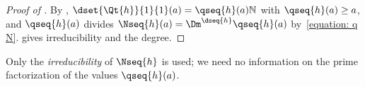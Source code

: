 \begin{proof}[Proof of ]
    By , $\dset{\Qt{h}}{1}{1}(a) = \qseq{h}(a) \nat$ with $\qseq{h}(a) \ge a$, and $\qseq{h}(a)$ divides $\Nseq{h}(a) = \Dm^{\dseq{h}} \qseq{h}(a)$ by~\eqref{equation: q N}.
     gives irreducibility and the degree.
\end{proof}
Only the \emph{irreducibility} of $\Nseq{h}$ is used; we need no information on the prime factorization of the values $\qseq{h}(a)$.
